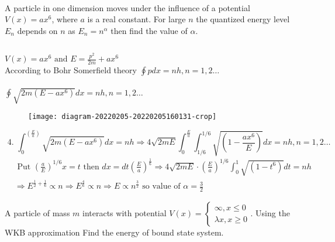 \begin{enumerate}
\begin{answer}
\begin{align*}
	\end{align*}
\end{answer}
	\begin{minipage}{\textwidth}
	\item A particle in one dimension moves under the influence of a potential $V(x)=a x^{6}$, where $a$ is a real constant. For large $n$ the quantized energy level $E_{n}$ depends on $n$ as $E_{n}=n^{\alpha}$ then find the value of $\alpha$.
\end{minipage}
\begin{answer}$\left. \right. $\\
	\begin{minipage}{0.5\textwidth}
	$V(x)=a x^{6} \text { and } E=\frac{p^{2}}{2 m}+a x^{6}$\\
	According to Bohr Somerfield theory $\oint p d x=n h, n=1,2 \ldots$\\\\
	$
	\oint \sqrt{2 m\left(E-a x^{6}\right)} d x=n h, n=1,2 \ldots
	$
	\end{minipage}
	 \begin{minipage}{0.5\textwidth}
	 \begin{figure}[H]
	 	\centering
	 	\texttt{[image: diagram-20220205-20220205160131-crop]}
	 \end{figure}
	 \end{minipage}
	 $$\text { 4. } \int_{0}^{\left(\frac{E}{a}\right)} \sqrt{2 m\left(E-a x^{6}\right)} d x=n h \Rightarrow 4 \sqrt{2 m E} \int_{0}^{\frac{E}{a}} \int_{1 / 6}^{1 / 6} \sqrt{\left(1-\frac{a x^{6}}{E}\right)} d x=n h, n=1,2 \ldots$$
	 \begin{align*}
	 	&\text { Put }\left(\frac{a}{E}\right)^{1 / 6} x=t \text { then } d x=d t\left(\frac{E}{a}\right)^{\frac{1}{6}} \Rightarrow 4 \sqrt{2 m E} \cdot\left(\frac{E}{a}\right)^{1 / 6} \int_{0}^{1} \sqrt{\left(1-t^{6}\right)} d t=n h \\
	 	&\Rightarrow E^{\frac{1}{2}+\frac{1}{6}} \propto n \Rightarrow E^{\frac{4}{6}} \propto n \Rightarrow E \propto n^{\frac{3}{2}} \text { so value of } \alpha=\frac{3}{2}
	 \end{align*}
\end{answer}
	\begin{minipage}{\textwidth}
	\item A particle of mass $m$ interacts with potential $V(x)=\left\{\begin{array}{l}\infty, x \leq 0 \\ \lambda x, x \geq 0\end{array} .\right.$ Using the WKB approximation Find the energy of bound state system.

\end{minipage}
\end{enumerate}
